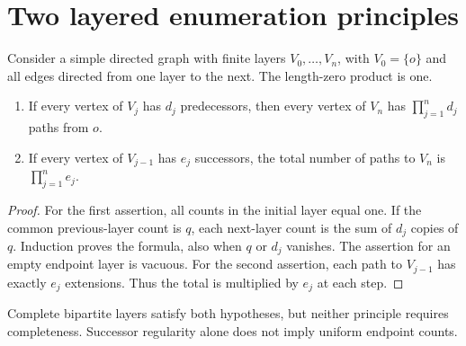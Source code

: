 \section{Two layered enumeration principles}
\begin{theorem}\label{thm:layers}
Consider a simple directed graph with finite layers $V_0,\ldots,V_n$, with $V_0=\{o\}$ and all edges directed from one layer to the next. The length-zero product is one.
\begin{enumerate}
\item If every vertex of $V_j$ has $d_j$ predecessors, then every vertex of $V_n$ has $\prod_{j=1}^n d_j$ paths from $o$.
\item If every vertex of $V_{j-1}$ has $e_j$ successors, the total number of paths to $V_n$ is $\prod_{j=1}^n e_j$.
\end{enumerate}
\end{theorem}
\begin{proof}
For the first assertion, all counts in the initial layer equal one. If the common previous-layer count is $q$, each next-layer count is the sum of $d_j$ copies of $q$. Induction proves the formula, also when $q$ or $d_j$ vanishes. The assertion for an empty endpoint layer is vacuous. For the second assertion, each path to $V_{j-1}$ has exactly $e_j$ extensions. Thus the total is multiplied by $e_j$ at each step.
\end{proof}
Complete bipartite layers satisfy both hypotheses, but neither principle requires completeness. Successor regularity alone does not imply uniform endpoint counts.
